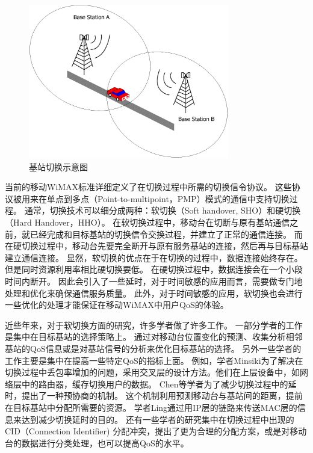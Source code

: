 \begin{figure}[t]
\begin{centering}
\includegraphics[height=6.75cm]{../figures/iccs_handover_bs}
\caption{基站切换示意图}
\label{fig:chap_iccs_handover_bs}
\end{centering}
\end{figure}

当前的移动WiMAX标准详细定义了在切换过程中所需的切换信令协议。
这些协议被用来在单点到多点（Point-to-multipoint，PMP）模式的通信中支持切换过程。
通常，切换技术可以细分成两种：软切换（Soft handover, SHO）和硬切换（Hard Handover，HHO）。
在软切换过程中，移动台在切断与原有基站通信之前，就已经完成和目标基站的切换信令交换过程，并建立了正常的通信连接。
而在硬切换过程中，移动台先要完全断开与原有服务基站的连接，然后再与目标基站建立通信连接。
显然，软切换的优点在于在切换的过程中，数据连接始终存在。
但是同时资源利用率相比硬切换要低。
在硬切换过程中，数据连接会在一个小段时间内断开。
因此会引入了一些延时，对于时间敏感的应用而言，需要做专门地处理和优化来确保通信服务质量。
此外，对于时间敏感的应用，软切换也会进行一些优化的处理才能保证在移动WiMAX中用户QoS的体验。


近些年来，对于软切换方面的研究，许多学者做了许多工作。
一部分学者的工作是集中在目标基站的选择策略上。
通过对移动台位置变化的预测、收集分析相邻基站的QoS信息或是对基站信号的分析来优化目标基站的选择\cite{Hsieh:INFOCOM2003}\cite{DooHwan:WPC2006}。
另外一些学者的工作主要是集中在提高一些特定QoS的指标上面。
例如，学者Minsiki为了解决在切换过程中丢包率增加的问题，采用交叉层的设计方法。他们在上层设备中，如网络层中的路由器，缓存切换用户的数据\cite{MinsikICACT2006}。
Chen等学者为了减少切换过程中的延时，提出了一种预协商的机制。
这个机制利用预测移动台与基站间的距离，提前在目标基站中分配所需要的资源\cite{JenHui:AUSWIRELESS:2007}。
学者Ling通过用IP层的链路来传送MAC层的信息来达到减少切换延时的目的\cite{LingVTC2007}。
还有一些学者的研究集中在切换过程中出现的CID（Connection Identifier) 分配冲突，提出了更为合理的分配方案，或是对移动台的数据进行分类处理，也可以提高QoS的水平\cite{Hu:TVT2004}\cite{Wenhua:ICC2007}。



